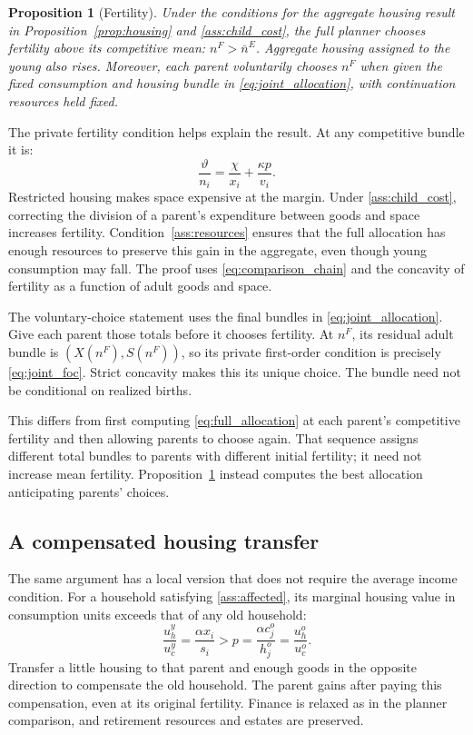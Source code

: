 \documentclass[11pt]{article}
\newtheorem{proposition}{Proposition}
\begin{document}
\begin{proposition}[Fertility]\label{prop:fertility}
Under the conditions for the aggregate housing result in
Proposition~\ref{prop:housing} and \eqref{ass:child_cost}, the full planner
chooses fertility above its competitive mean: $n^F>\bar n^E$. Aggregate
housing assigned to the young also rises. Moreover, each parent voluntarily
chooses $n^F$ when given the fixed consumption and housing bundle in
\eqref{eq:joint_allocation}, with continuation resources held fixed.
\end{proposition}

The private fertility condition helps explain the result. At any competitive
bundle it is:
\begin{equation}
\frac{\vartheta}{n_i}
 =\frac{\chi}{x_i}+\frac{\kappa p}{v_i}.
\label{eq:private_foc}
\end{equation}
Restricted housing makes space expensive at the margin. Under
\eqref{ass:child_cost}, correcting the division of a parent's expenditure
between goods and space increases fertility. Condition~\eqref{ass:resources}
ensures that the full allocation has enough resources to preserve this gain
in the aggregate, even though young consumption may fall. The proof uses
\eqref{eq:comparison_chain} and the concavity of fertility as a function of
adult goods and space.

The voluntary-choice statement uses the final bundles in
\eqref{eq:joint_allocation}. Give each parent those totals before it chooses
fertility. At $n^F$, its residual adult bundle is $(X(n^F),S(n^F))$, so its
private first-order condition is precisely \eqref{eq:joint_foc}. Strict
concavity makes this its unique choice. The bundle need not be conditional
on realized births.

This differs from first computing \eqref{eq:full_allocation} at each parent's
competitive fertility and then allowing parents to choose again. That
sequence assigns different total bundles to parents with different initial
fertility; it need not increase mean fertility. Proposition~\ref{prop:fertility}
instead computes the best allocation anticipating parents' choices.

\subsection{A compensated housing transfer}

The same argument has a local version that does not require the average
income condition. For a household satisfying \eqref{ass:affected}, its
marginal housing value in consumption units exceeds that of any old household:
\begin{equation}
\frac{u_h^y}{u_c^y}=\frac{\alpha x_i}{s_i}>p
 =\frac{\alpha c_j^o}{h_j^o}=\frac{u_h^o}{u_c^o}.
\label{eq:local_mrs}
\end{equation}
Transfer a little housing to that parent and enough goods in the opposite
direction to compensate the old household. The parent gains after paying
this compensation, even at its original fertility. Finance is relaxed as in
the planner comparison, and retirement resources and estates are preserved.
\end{document}
